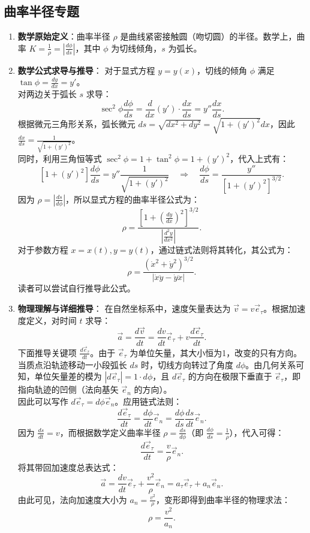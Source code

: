 \documentclass[UTF8]{ctexart}
\begin{document}
	\subsection*{曲率半径专题}
	\begin{enumerate}
		\item \textbf{数学原始定义}：曲率半径 $\rho$ 是曲线紧密接触圆（吻切圆）的半径。数学上，曲率 $K = \frac{1}{\rho} = \left|\frac{d\phi}{ds}\right|$，其中 $\phi$ 为切线倾角，$s$ 为弧长。
		\item \textbf{数学公式求导与推导}：
		对于显式方程 $y=y(x)$，切线的倾角 $\phi$ 满足 $\tan\phi = \frac{dy}{dx} = y'$。\\
		对两边关于弧长 $s$ 求导：
		\[
		\sec^2\phi \frac{d\phi}{ds} = \frac{d}{dx}(y') \cdot \frac{dx}{ds} = y'' \frac{dx}{ds}.
		\]
		根据微元三角形关系，弧长微元 $ds = \sqrt{dx^2 + dy^2} = \sqrt{1 + (y')^2}dx$，因此 $\frac{dx}{ds} = \frac{1}{\sqrt{1 + (y')^2}}$。\\
		同时，利用三角恒等式 $\sec^2\phi = 1 + \tan^2\phi = 1 + (y')^2$，代入上式有：
		\[
		[1 + (y')^2] \frac{d\phi}{ds} = y'' \frac{1}{\sqrt{1 + (y')^2}} \quad\Rightarrow\quad \frac{d\phi}{ds} = \frac{y''}{[1 + (y')^2]^{3/2}}.
		\]
		因为 $\rho = \left|\frac{ds}{d\phi}\right|$，所以显式方程的曲率半径公式为：
		\[
		\rho = \frac{\left[1 + \left(\frac{dy}{dx}\right)^2\right]^{3/2}}{\left|\frac{d^2y}{dx^2}\right|}.
		\]
		对于参数方程 $x=x(t), y=y(t)$，通过链式法则将其转化，其公式为：
		\[
		\rho = \frac{(\dot{x}^2 + \dot{y}^2)^{3/2}}{|\dot{x}\ddot{y} - \dot{y}\ddot{x}|}.
		\]
		读者可以尝试自行推导此公式。
		
		\item \textbf{物理理解与详细推导}：
		在自然坐标系中，速度矢量表达为 $\vec{v} = v \vec{e}_\tau$。根据加速度定义，对时间 $t$ 求导：
		\[
		\vec{a} = \frac{d\vec{v}}{dt} = \frac{dv}{dt}\vec{e}_\tau + v\frac{d\vec{e}_\tau}{dt}.
		\]
		下面推导关键项 $\frac{d\vec{e}_\tau}{dt}$。由于 $\vec{e}_\tau$ 为单位矢量，其大小恒为1，改变的只有方向。当质点沿轨迹移动一小段弧长 $ds$ 时，切线方向转过了角度 $d\phi$。由几何关系可知，单位矢量差的模为 $|d\vec{e}_\tau| = 1 \cdot d\phi$，且 $d\vec{e}_\tau$ 的方向在极限下垂直于 $\vec{e}_\tau$，即指向轨迹的凹侧（法向基矢 $\vec{e}_n$ 的方向）。\\
		因此可以写作 $d\vec{e}_\tau = d\phi \vec{e}_n$。应用链式法则：
		\[
		\frac{d\vec{e}_\tau}{dt} = \frac{d\phi}{dt}\vec{e}_n = \frac{d\phi}{ds}\frac{ds}{dt}\vec{e}_n.
		\]
		因为 $\frac{ds}{dt} = v$，而根据数学定义曲率半径 $\rho = \frac{ds}{d\phi}$（即 $\frac{d\phi}{ds} = \frac{1}{\rho}$），代入可得：
		\[
		\frac{d\vec{e}_\tau}{dt} = \frac{v}{\rho}\vec{e}_n.
		\]
		将其带回加速度总表达式：
		\[
		\vec{a} = \frac{dv}{dt}\vec{e}_\tau + \frac{v^2}{\rho}\vec{e}_n = a_\tau \vec{e}_\tau + a_n \vec{e}_n.
		\]
		由此可见，法向加速度大小为 $a_n = \frac{v^2}{\rho}$，变形即得到曲率半径的物理求法：
		\[
		\rho = \frac{v^2}{a_n}.
		\]
	\end{enumerate}
	
\end{document}
